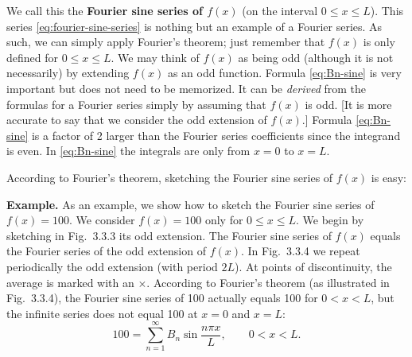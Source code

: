 We call this the \textbf{Fourier sine series of $f(x)$} (on the interval $0 \le x \le L$).  This series \eqref{eq:fourier-sine-series} is nothing but an example of a Fourier series.  As such, we can simply apply Fourier's theorem; just remember that $f(x)$ is only defined for $0 \le x \le L$.  We may think of $f(x)$ as being odd (although it is not necessarily) by extending $f(x)$ as an odd function.  Formula \eqref{eq:Bn-sine} is very important but does not need to be memorized.  It can be \textit{derived} from the formulas for a Fourier series simply by assuming that $f(x)$ is odd.  [It is more accurate to say that we consider the odd extension of $f(x)$.]  Formula \eqref{eq:Bn-sine} is a factor of 2 larger than the Fourier series coefficients since the integrand is even.  In \eqref{eq:Bn-sine} the integrals are only from $x = 0$ to $x = L$.

According to Fourier's theorem, sketching the Fourier sine series of $f(x)$ is easy:

\begin{center}
\end{center}

\textbf{Example.}  As an example, we show how to sketch the Fourier sine series of $f(x) = 100$.  We consider $f(x) = 100$ only for $0 \le x \le L$.  We begin by sketching in Fig.~3.3.3 its odd extension.  The Fourier sine series of $f(x)$ equals the Fourier series of the odd extension of $f(x)$.  In Fig.~3.3.4 we repeat periodically the odd extension (with period $2L$).  At points of discontinuity, the average is marked with an $\times$.  According to Fourier's theorem (as illustrated in Fig.~3.3.4), the Fourier sine series of 100 actually equals 100 for $0 < x < L$, but the infinite series does not equal 100 at $x = 0$ and $x = L$:
\begin{equation}
\label{eq:sine100}
100 = \sum_{n=1}^{\infty} B_n \sin \frac{n\pi x}{L}, \qquad 0 < x < L.
\end{equation}

